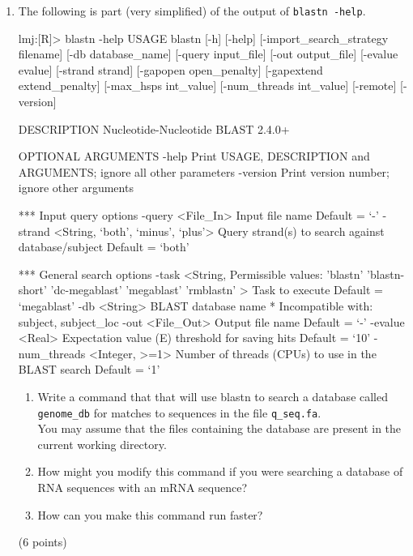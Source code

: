 \documentclass[11pt]{article}
\begin{document}
\begin{enumerate}
\item The following is part (very simplified) of the output of \texttt{blastn -help}.\\
  \begin{consolecode}
lmj:[R]> blastn -help 
USAGE                                                                                                                                                 
  blastn [-h] [-help] [-import_search_strategy filename]                                                                                              
    [-db database_name] [-query input_file]                                                                            
    [-out output_file] [-evalue evalue] [-strand strand]
    [-gapopen open_penalty] [-gapextend extend_penalty]                                                                                               
    [-max_hsps int_value] [-num_threads int_value] [-remote]
    [-version]

DESCRIPTION
   Nucleotide-Nucleotide BLAST 2.4.0+

OPTIONAL ARGUMENTS
 -help
   Print USAGE, DESCRIPTION and ARGUMENTS; ignore all other parameters
 -version
   Print version number;  ignore other arguments

 *** Input query options
 -query <File_In>
   Input file name
   Default = `-'
 -strand <String, `both', `minus', `plus'>
   Query strand(s) to search against database/subject
   Default = `both'

 *** General search options
 -task <String, Permissible values: 'blastn' 'blastn-short' 
           'dc-megablast' 'megablast' 'rmblastn' >
   Task to execute
   Default = `megablast'
 -db <String>
   BLAST database name
    * Incompatible with:  subject, subject_loc
 -out <File_Out>
   Output file name
   Default = `-'
 -evalue <Real>
   Expectation value (E) threshold for saving hits 
   Default = `10'
 -num_threads <Integer, >=1>
   Number of threads (CPUs) to use in the BLAST search
   Default = `1'
  \end{consolecode}

  \begin{enumerate}
  \item 
    Write a command that that will use blastn to search a database called
    \texttt{genome\_db} for matches to sequences in the file \texttt{q\_seq.fa}.\\
    You may assume that the files containing the database are present in the
    current working directory.
  \item How might you modify this command if you were searching a database of
    RNA sequences with an mRNA sequence?
  \item How can you make this command run faster?
  \end{enumerate}
  (6 points)



\end{enumerate}
\end{document}
